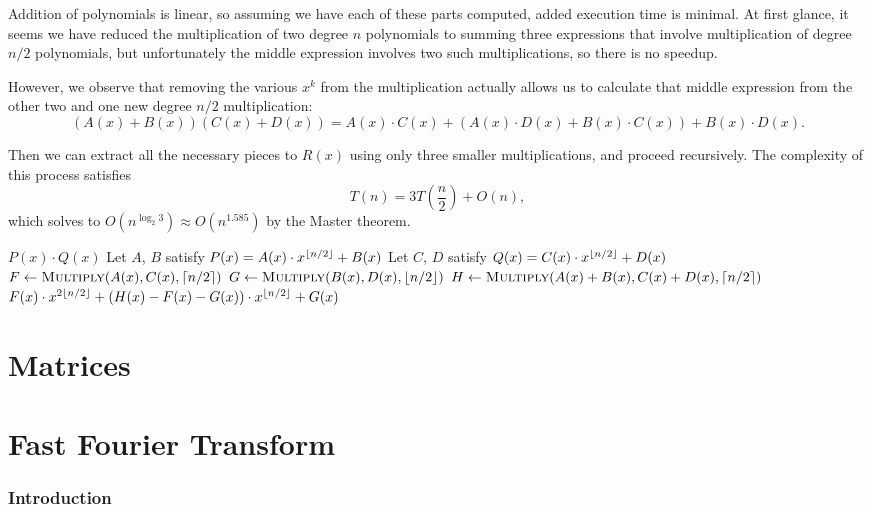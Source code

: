 Addition of polynomials is linear, so assuming we have each of these parts computed, 
added execution time is minimal. At first glance, it seems we have reduced the multiplication
of two degree $n$ polynomials to summing three expressions that involve multiplication
of degree $n/2$ polynomials, but unfortunately the middle expression involves two such
multiplications, so there is no speedup.

However, we observe that removing the various $x^k$ from the multiplication actually
allows us to calculate that middle expression from the other two and one new 
degree $n/2$ multiplication:
\[
(A(x) + B(x))(C(x) + D(x)) = A(x) \cdot C(x) + (A(x) \cdot D(x) + B(x) \cdot C(x)) + B(x) \cdot D(x).
\]

Then we can extract all the necessary pieces to $R(x)$ using only three smaller 
multiplications, and proceed recursively. The complexity of this process satisfies
\[T(n) = 3 T\left(\frac{n}{2}\right) + O(n),\]
which solves to $O(n^{\log_2{3}}) \approx O(n^{1.585})$ by the Master theorem.

\begin{algorithm}[H]
\caption{Karatsuba}
\begin{algorithmic}
		\State \Return $P(x) \cdot Q(x)$ 
	\EndIf
	\State Let $A$, $B$ satisfy $P(x) = A(x) \cdot x^{\left\lfloor n/2 \right\rfloor} + B(x)$
	\State Let $C$, $D$ satisfy $Q(x) = C(x) \cdot x^{\left\lfloor n/2 \right\rfloor} + D(x)$
	\State $F \gets \Call{Multiply}{A(x), C(x), \ceiling{n/2}}$
	\State $G \gets \Call{Multiply}{B(x), D(x), \floor{n/2}}$
	\State $H \gets \Call{Multiply}{A(x) + B(x), C(x) + D(x), \ceiling{n/2}}$
	\State \Return $F(x) \cdot x^{2 \left\lfloor n/2 \right\rfloor} + (H(x) - F(x) - G(x)) \cdot x^{\left\lfloor n/2 \right\rfloor} + G(x)$
\EndFunction
\end{algorithmic}
\end{algorithm}

\section{Matrices}

\section{Fast Fourier Transform}

\subsubsection{Introduction}

